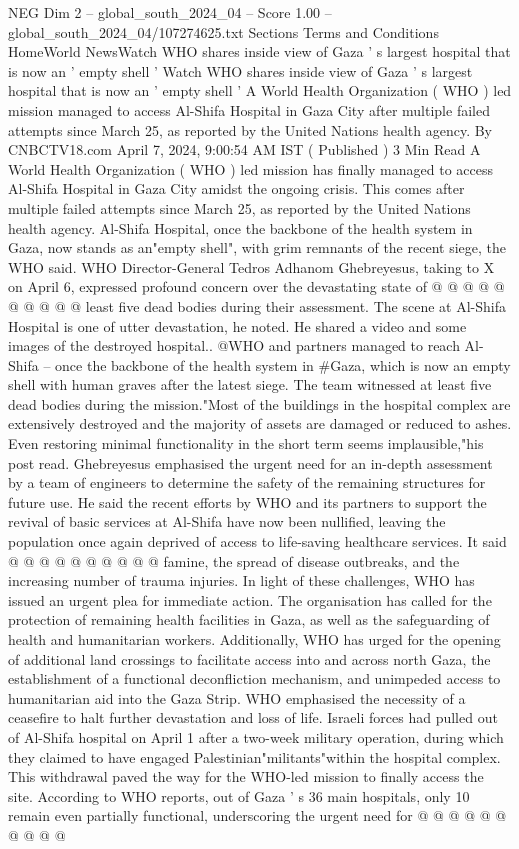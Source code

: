 \begin{textsample}{NEG Dim 2 – global\_south\_2024\_04 – Score 1.00 – global\_south\_2024\_04/107274625.txt}  \label{ex:f2_neg_401}
Sections Terms and Conditions HomeWorld NewsWatch WHO shares inside view of Gaza ' s largest hospital that is now an ' empty shell ' Watch WHO shares inside view of Gaza ' s largest hospital that is now an ' empty shell ' A World Health Organization ( WHO ) led mission managed to access Al-Shifa Hospital in Gaza City after multiple failed attempts since March 25, as reported by the United Nations health agency.
By CNBCTV18.com April 7, 2024, 9:00:54 AM IST ( Published ) 3 Min Read A World Health Organization ( WHO ) led mission has finally managed to access Al-Shifa Hospital in Gaza City amidst the ongoing crisis.
This comes after multiple failed attempts since March 25, as reported by the United Nations health agency.
Al-Shifa Hospital, once the backbone of the health system in Gaza, now stands as an"empty shell", with grim remnants of the recent siege, the WHO said.
WHO Director-General Tedros Adhanom Ghebreyesus, taking to X on April 6, expressed profound concern over the devastating state of @ @ @ @ @ @ @ @ @ @ least five dead bodies during their assessment.
The scene at Al-Shifa Hospital is one of utter devastation, he noted.
He shared a video and some images of the destroyed hospital.. @WHO and partners managed to reach Al-Shifa -- once the backbone of the health system in \#Gaza, which is now an empty shell with human graves after the latest siege.
The team witnessed at least five dead bodies during the mission."Most of the buildings in the hospital complex are extensively destroyed and the majority of assets are damaged or reduced to ashes.
Even restoring minimal functionality in the short term seems implausible,"his post read.
Ghebreyesus emphasised the urgent need for an in-depth assessment by a team of engineers to determine the safety of the remaining structures for future use.
He said the recent efforts by WHO and its partners to support the revival of basic services at Al-Shifa have now been nullified, leaving the population once again deprived of access to life-saving healthcare services.
It said @ @ @ @ @ @ @ @ @ @ famine, the spread of disease outbreaks, and the increasing number of trauma injuries.
In light of these challenges, WHO has issued an urgent plea for immediate action.
The organisation has called for the protection of remaining health facilities in Gaza, as well as the safeguarding of health and humanitarian workers.
Additionally, WHO has urged for the opening of additional land crossings to facilitate access into and across north Gaza, the establishment of a functional deconfliction mechanism, and unimpeded access to humanitarian aid into the Gaza Strip.
WHO emphasised the necessity of a ceasefire to halt further devastation and loss of life.
Israeli forces had pulled out of Al-Shifa hospital on April 1 after a two-week military operation, during which they claimed to have engaged Palestinian"militants"within the hospital complex.
This withdrawal paved the way for the WHO-led mission to finally access the site.
According to WHO reports, out of Gaza ' s 36 main hospitals, only 10 remain even partially functional, underscoring the urgent need for @ @ @ @ @ @ @ @ @ @

\end{textsample}
